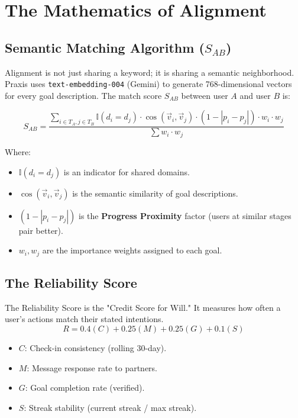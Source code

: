 \documentclass[11pt,a4paper,oneside]{article}
\begin{document}
\section{The Mathematics of Alignment}

\subsection{Semantic Matching Algorithm ($S_{AB}$)}
Alignment is not just sharing a keyword; it is sharing a semantic neighborhood. Praxis uses \texttt{text-embedding-004} (Gemini) to generate 768-dimensional vectors for every goal description. The match score $S_{AB}$ between user $A$ and user $B$ is:

\begin{equation}
S_{AB} = \frac{\sum_{i \in T_A, j \in T_B} \mathbb{I}(d_i = d_j) \cdot \cos(\vec{v}_i, \vec{v}_j) \cdot (1 - |p_i - p_j|) \cdot w_i \cdot w_j}{\sum w_i \cdot w_j}
\end{equation}

Where:
\begin{itemize}
    \item $\mathbb{I}(d_i = d_j)$ is an indicator for shared domains.
    \item $\cos(\vec{v}_i, \vec{v}_j)$ is the semantic similarity of goal descriptions.
    \item $(1 - |p_i - p_j|)$ is the \textbf{Progress Proximity} factor (users at similar stages pair better).
    \item $w_i, w_j$ are the importance weights assigned to each goal.
\end{itemize}

\subsection{The Reliability Score}
The Reliability Score is the "Credit Score for Will." It measures how often a user's actions match their stated intentions.
\begin{equation}
R = 0.4(C) + 0.25(M) + 0.25(G) + 0.1(S)
\end{equation}
\begin{itemize}
    \item $C$: Check-in consistency (rolling 30-day).
    \item $M$: Message response rate to partners.
    \item $G$: Goal completion rate (verified).
    \item $S$: Streak stability (current streak / max streak).
\end{itemize}
\end{document}
